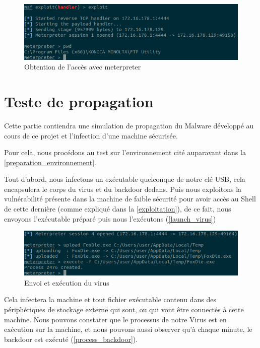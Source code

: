     \begin{figure}[H]
        \centering
        \includegraphics[width=\linewidth]{images/meterpreter.png}
        \caption{Obtention de l'accès avec meterpreter}
        \label{obtention_accees_meterpreter}
    \end{figure}

\section{Teste de propagation}
Cette partie contiendra une simulation de propagation du Malware développé au cours de ce projet et 
l'infection d'une machine sécurisée.

Pour cela, nous procédons au test sur l’environnement cité auparavant dans la \autoref{preparation_environnement}.

Tout d'abord, nous infectons un exécutable quelconque de notre clé USB, cela encapsulera le corps du virus et du 
backdoor dedans. Puis nous exploitons la vulnérabilité présente dans la machine de faible sécurité pour avoir 
accès au Shell de cette dernière (comme expliqué dans la \autoref{exploitation}), de ce fait, nous envoyons 
l'exécutable préparé puis nous l’exécutons (\autoref{launch_virus})

\begin{figure}[H]
    \centering
    \includegraphics[width=\linewidth]{images/exec_virus.png}
    \caption{Envoi et exécution du virus}
    \label{launch_virus}
\end{figure}
Cela infectera la machine et tout fichier exécutable contenu dans des périphériques de stockage externe qui sont, ou qui vont  être connectés à cette machine.  Nous pouvons constater que le processus de notre Virus est en exécution sur la machine, et nous pouvons aussi observer qu'à chaque minute, le backdoor est exécuté (\autoref{process_backdoor}).


